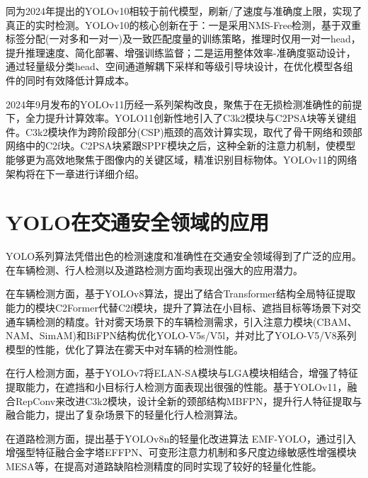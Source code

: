 同为2024年提出的YOLOv10相较于前代模型，刷新/了速度与准确度上限，实现了真正的实时检测\cite{yolov10}。YOLOv10的核心创新在于：一是采用NMS-Free检测，基于双重标签分配(一对多和一对一)及一致匹配度量的训练策略，推理时仅用一对一head，提升推理速度、简化部署、增强训练监督；二是运用整体效率-准确度驱动设计，通过轻量级分类head、空间通道解耦下采样和等级引导块设计，在优化模型各组件的同时有效降低计算成本。

2024年9月发布的YOLOv11历经一系列架构改良，聚焦于在无损检测准确性的前提下，全力提升计算效率。YOLO11创新性地引入了C3k2模块与C2PSA块等关键组件。C3k2模块作为跨阶段部分(CSP)瓶颈的高效计算实现，取代了骨干网络和颈部网络中的C2f块。C2PSA块紧跟SPPF模块之后，这种全新的注意力机制，使模型能够更为高效地聚焦于图像内的关键区域，精准识别目标物体。YOLOv11的网络架构将在下一章进行详细介绍。





\section{YOLO在交通安全领域的应用}
YOLO系列算法凭借出色的检测速度和准确性在交通安全领域得到了广泛的应用。在车辆检测、行人检测以及道路检测方面均表现出强大的应用潜力。

在车辆检测方面，\textcite{ex1}基于YOLOv8算法，提出了结合Transformer结构全局特征提取能力的模块C2Former代替C2f模块，提升了算法在小目标、遮挡目标等场景下对交通车辆检测的精度。\textcite{ex2}针对雾天场景下的车辆检测需求，引入注意力模块(CBAM、NAM、SimAM)和BiFPN结构优化YOLO-V5s/V5l，并对比了YOLO-V5/V8系列模型的性能，优化了算法在雾天中对车辆的检测性能。

在行人检测方面，\textcite{ex3}基于YOLOv7将ELAN-SA模块与LGA模块相结合，增强了特征提取能力，在遮挡和小目标行人检测方面表现出很强的性能。\textcite{ex4}基于YOLOv11，融合RepConv来改进C3k2模块，设计全新的颈部结构MBFPN，提升行人特征提取与融合能力，提出了复杂场景下的轻量化行人检测算法。

在道路检测方面，\textcite{ex5}提出基于YOLOv8n的轻量化改进算法 EMF-YOLO，通过引入增强型特征融合金字塔EFFPN、可变形注意力机制和多尺度边缘敏感性增强模块MESA等，在提高对道路缺陷检测精度的同时实现了较好的轻量化性能。 

